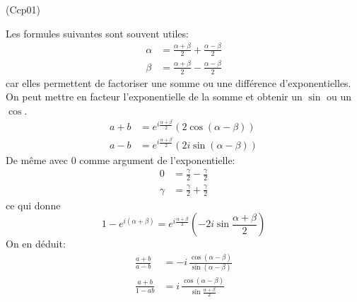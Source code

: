 \begin{tiny}(Ccp01)\end{tiny} \label{Ccp01} Les formules suivantes sont souvent utiles:
\begin{align*}
 \alpha &= \frac{\alpha + \beta}{2} + \frac{\alpha - \beta}{2}\\
 \beta &= \frac{\alpha + \beta}{2} - \frac{\alpha - \beta}{2}
\end{align*}
car elles permettent de factoriser une somme ou une différence d'exponentielles.\\
On peut mettre en facteur l'exponentielle de la somme et obtenir un $\sin$ ou un $\cos$.
\begin{align*}
 a+b &= e^{i\frac{\alpha + \beta}{2}}\left( 2\cos(\alpha - \beta)\right)\\ 
 a-b &= e^{i\frac{\alpha + \beta}{2}}\left( 2i\sin(\alpha - \beta)\right)
\end{align*}
De même avec $0$ comme argument de l'exponentielle:
\begin{align*}
 0  &= \frac{\gamma}{2}-\frac{\gamma}{2}\\
 \gamma &= \frac{\gamma}{2}+\frac{\gamma}{2}
\end{align*}
ce qui donne
\begin{displaymath}
 1-e^{i(\alpha + \beta)}=e^{i\frac{\alpha + \beta}{2}}\left(-2i\sin \frac{\alpha + \beta}{2}\right) 
\end{displaymath}
On en déduit:
\begin{align*}
 \frac{a+b}{a-b} &= -i\,\frac{\cos(\alpha - \beta)}{\sin(\alpha - \beta)}\\
 \frac{a+b}{1-ab} &= i\,\frac{\cos(\alpha - \beta)}{\sin \frac{\alpha + \beta}{2}}
\end{align*}

 